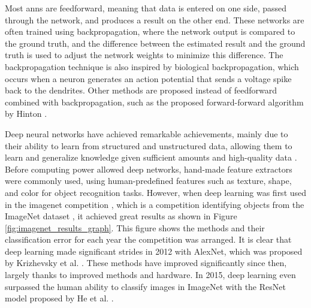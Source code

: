    
    
    Most \glspl{ann} are feedforward, meaning that data is entered on one side, passed through the network, and produces a result on the other end. These networks are often trained using backpropagation, where the network output is compared to the ground truth, and the difference between the estimated result and the ground truth is used to adjust the network weights to minimize this difference. The backpropagation technique is also inspired by biological backpropagation, which occurs when a neuron generates an action potential that sends a voltage spike back to the dendrites. Other methods are proposed instead of feedforward combined with backpropagation, such as the proposed forward-forward algorithm by Hinton \cite{hintonForwardForwardAlgorithmPreliminary2022}.


    Deep neural networks have achieved remarkable achievements, mainly due to their ability to learn from structured and unstructured data, allowing them to learn and generalize knowledge given sufficient amounts and high-quality data \cite{willeminkPreparingMedicalImaging2020}. Before computing power allowed deep networks, hand-made feature extractors were commonly used, using human-predefined features such as texture, shape, and color for object recognition tasks. However, when deep learning was first used in the \gls{imagenet} competition \cite{russakovskyImageNetLargeScale2015}, which is a competition identifying objects from the ImageNet dataset \cite{russakovskyImageNetLargeScale2015}, it achieved great results as shown in Figure \ref{fig:imagenet_results_graph}. This figure shows the methods and their classification error for each year the competition was arranged. It is clear that deep learning made significant strides in 2012 with AlexNet, which was proposed by Krizhevsky et al. \cite{krizhevskyImageNetClassificationDeep2017}. These methods have improved significantly since then, largely thanks to improved methods and hardware. In 2015, deep learning even surpassed the human ability to classify images in ImageNet with the ResNet model proposed by He et al. \cite{heDeepResidualLearning2015, heDelvingDeepRectifiers2015}.
    
